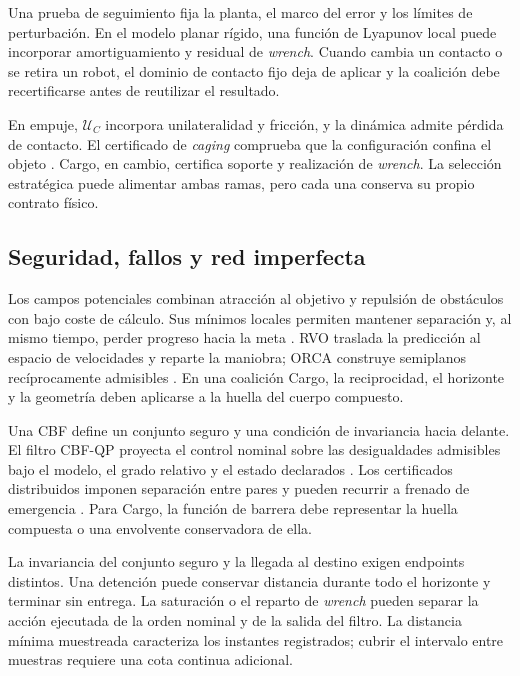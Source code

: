 Una prueba de seguimiento fija la planta, el marco del error y los límites de perturbación. En el modelo planar rígido, una función de Lyapunov local puede incorporar amortiguamiento y residual de \emph{wrench}. Cuando cambia un contacto o se retira un robot, el dominio de contacto fijo deja de aplicar y la coalición debe recertificarse antes de reutilizar el resultado.

En empuje, \(\mathcal U_C\) incorpora unilateralidad y fricción, y la dinámica admite pérdida de contacto. El certificado de \emph{caging} comprueba que la configuración confina el objeto \parencite{pereira2004caging,fink2008caging}. Cargo, en cambio, certifica soporte y realización de \emph{wrench}. La selección estratégica puede alimentar ambas ramas, pero cada una conserva su propio contrato físico.

\subsection{Seguridad, fallos y red imperfecta}
\label{subsec:tf-industrial-constraints}

Los campos potenciales combinan atracción al objetivo y repulsión de obstáculos con bajo coste de cálculo. Sus mínimos locales permiten mantener separación y, al mismo tiempo, perder progreso hacia la meta \parencite{khatib1986obstacle}. RVO traslada la predicción al espacio de velocidades y reparte la maniobra; ORCA construye semiplanos recíprocamente admisibles \parencite{vandenberg2008rvo,vandenberg2011orca}. En una coalición Cargo, la reciprocidad, el horizonte y la geometría deben aplicarse a la huella del cuerpo compuesto.

Una CBF define un conjunto seguro y una condición de invariancia hacia delante. El filtro CBF-QP proyecta el control nominal sobre las desigualdades admisibles bajo el modelo, el grado relativo y el estado declarados \parencite{ames2017cbf}. Los certificados distribuidos imponen separación entre pares y pueden recurrir a frenado de emergencia \parencite{wang2017barrier}. Para Cargo, la función de barrera debe representar la huella compuesta o una envolvente conservadora de ella.

La invariancia del conjunto seguro y la llegada al destino exigen endpoints distintos. Una detención puede conservar distancia durante todo el horizonte y terminar sin entrega. La saturación o el reparto de \emph{wrench} pueden separar la acción ejecutada de la orden nominal y de la salida del filtro. La distancia mínima muestreada caracteriza los instantes registrados; cubrir el intervalo entre muestras requiere una cota continua adicional.

